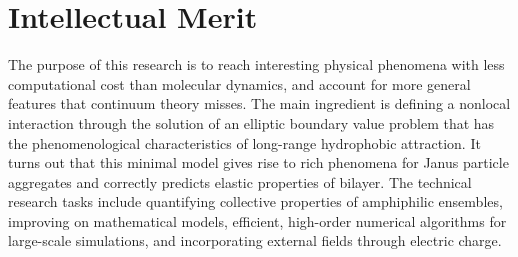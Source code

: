 %
%

\section{Intellectual Merit}
The purpose of this research is to reach interesting physical phenomena
with less computational cost than molecular dynamics, and account for
more general features that continuum theory misses. The main ingredient
is defining a nonlocal interaction through the solution of an elliptic
boundary value problem that has the phenomenological characteristics of
long-range hydrophobic attraction. It turns out that this minimal model
gives rise to rich phenomena for Janus particle aggregates and correctly
predicts elastic properties of bilayer. The technical research tasks
include quantifying collective properties of amphiphilic ensembles,
improving on mathematical models, 
efficient, high-order numerical algorithms for large-scale simulations,
and incorporating external fields through electric charge.



